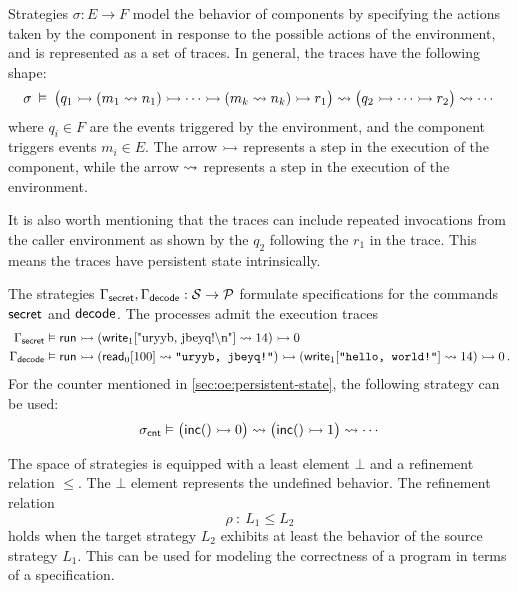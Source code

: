 Strategies $\sigma : E \rightarrow F$
model the behavior of components
by specifying the actions
taken by the component
in response to the possible actions of the environment,
and is represented as a set of traces.
In general,
the traces have the following shape:
\[
  \sigma \:\vDash\:
  \big(q_1 \rightarrowtail
    (m_1 \leadsto n_1) \rightarrowtail
    \cdots \rightarrowtail
    (m_k \leadsto n_k) \rightarrowtail
  r_1\big)
  \leadsto
  \big(q_2 \rightarrowtail
    \cdots \rightarrowtail
  r_2\big)
  \leadsto
  \cdots
\]
where $q_i \in F$ are the events triggered by the environment,
and the component triggers events $m_i \in E$.
The arrow $\rightarrowtail$ represents a step in the execution of the component,
while the arrow $\leadsto$ represents a step in the execution of the environment.

It is also worth mentioning that
the traces can include repeated invocations from the caller environment
as shown by the $q_2$ following the $r_1$ in the trace.
This means the traces
have persistent state intrinsically.

\begin{example}
  \label{ex:decodespec}
  The strategies
  $\Gamma_{ \mathsf{secret} }, \Gamma_{ \mathsf{decode} } : \mathcal{S} \rightarrow \mathcal{P}$
  formulate specifications for the commands $ \mathsf{secret} $ and $ \mathsf{decode} $.
  The processes admit the execution traces
  {\small
    \begin{align*}
      \Gamma_{ \mathsf{secret} } &\vDash  \mathsf{run} 
      \rightarrowtail ( \mathsf{write} _1[\texttt{\textnormal{"uryyb, jbeyq!\textbackslash{}n"}}] \leadsto 14)
      \rightarrowtail 0
      \\
      \Gamma_{ \mathsf{decode} } &\vDash  \mathsf{run} 
      \rightarrowtail ( \mathsf{read} _0[100] \leadsto \texttt{"uryyb, jbeyq!"})
      \rightarrowtail ( \mathsf{write} _1[\texttt{"hello, world!"}] \leadsto 14)
      \rightarrowtail 0
      \,.
  \end{align*}}
  For the counter mentioned in \autoref{sec:oe:persistent-state},
  the following strategy can be used:
  \[
    \sigma_{ \mathsf{cnt} } \vDash \big( \mathsf{inc} () \rightarrowtail 0\big) \leadsto
    \big( \mathsf{inc} () \rightarrowtail 1\big) \leadsto \cdots
  \]
\end{example}

The space of strategies
is equipped with a least element $\bot$
and a refinement relation $\le$.
The $\bot$ element represents the undefined behavior.
The refinement relation
\[
  \rho \::\: L_1 \le L_2
\]
holds when the target strategy $L_2$
exhibits at least the behavior
of the source strategy $L_1$.
This can be used for modeling
the correctness of a program
in terms of a specification.

